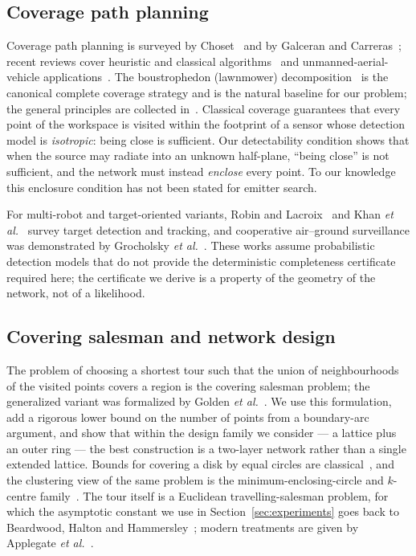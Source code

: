 \documentclass[journal,10pt]{IEEEtran}
\theoremstyle{definition}
\begin{document}
\subsection{Coverage path planning}
Coverage path planning is surveyed by Choset~\cite{choset2001} and by Galceran and
Carreras~\cite{galceran2013}; recent reviews cover heuristic and classical
algorithms~\cite{tan2021} and unmanned-aerial-vehicle applications~\cite{cabreira2019}. The
boustrophedon (lawnmower) decomposition~\cite{choset1998} is the canonical complete coverage
strategy and is the natural baseline for our problem; the general principles are collected
in~\cite{choset2005}. Classical coverage guarantees that every point of the workspace is visited
within the footprint of a sensor whose detection model is \emph{isotropic}: being close is
sufficient. Our detectability condition shows that when the source may radiate into an unknown
half-plane, ``being close'' is not sufficient, and the network must instead \emph{enclose} every
point. To our knowledge this enclosure condition has not been stated for emitter search.

For multi-robot and target-oriented variants, Robin and Lacroix~\cite{robin2016} and Khan
\emph{et al.}~\cite{khan2018} survey target detection and tracking, and cooperative air--ground
surveillance was demonstrated by Grocholsky \emph{et al.}~\cite{grocholsky2006}. These works
assume probabilistic detection models that do not provide the deterministic completeness
certificate required here; the certificate we derive is a property of the geometry of the
network, not of a likelihood.

\subsection{Covering salesman and network design}
The problem of choosing a shortest tour such that the union of neighbourhoods of the visited
points covers a region is the covering salesman problem; the generalized variant was formalized by
Golden \emph{et al.}~\cite{golden2012}. We use this formulation, add a rigorous lower bound on the
number of points from a boundary-arc argument, and show that within the design family we consider --- a lattice plus an outer ring --- the best construction is a two-layer network rather than a single extended lattice. Bounds for covering a disk by equal circles are
classical~\cite{nica2011,jung1901,toth1998}, and the clustering view of the same problem is the
minimum-enclosing-circle and $k$-centre family~\cite{gonzalez1985,preparata1985}. The tour itself
is a Euclidean travelling-salesman problem, for which the asymptotic constant we use in
Section~\ref{sec:experiments} goes back to Beardwood, Halton and
Hammersley~\cite{beardwood1959}; modern treatments are given by
Applegate \emph{et al.}~\cite{applegate2006}.
\end{document}
